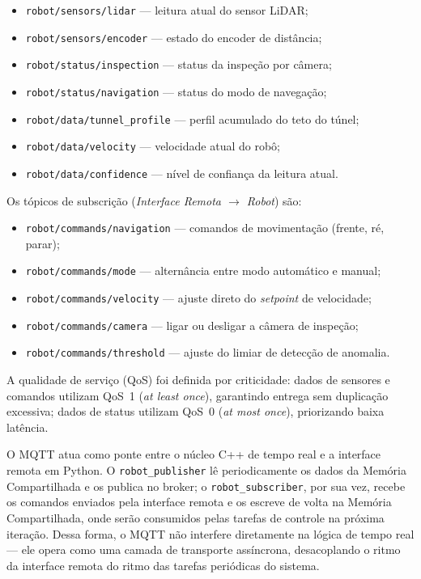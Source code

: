 \documentclass[12pt]{article}
\begin{document}
\begin{itemize}
    \item \texttt{robot/sensors/lidar} — leitura atual do sensor LiDAR;
    \item \texttt{robot/sensors/encoder} — estado do encoder de distância;
    \item \texttt{robot/status/inspection} — status da inspeção por câmera;
    \item \texttt{robot/status/navigation} — status do modo de navegação;
    \item \texttt{robot/data/tunnel\_profile} — perfil acumulado do teto do túnel;
    \item \texttt{robot/data/velocity} — velocidade atual do robô;
    \item \texttt{robot/data/confidence} — nível de confiança da leitura atual.
\end{itemize}

Os tópicos de subscrição (\textit{Interface Remota $\rightarrow$ Robot}) são:

\begin{itemize}
    \item \texttt{robot/commands/navigation} — comandos de movimentação (frente, ré, parar);
    \item \texttt{robot/commands/mode} — alternância entre modo automático e manual;
    \item \texttt{robot/commands/velocity} — ajuste direto do \textit{setpoint} de velocidade;
    \item \texttt{robot/commands/camera} — ligar ou desligar a câmera de inspeção;
    \item \texttt{robot/commands/threshold} — ajuste do limiar de detecção de anomalia.
\end{itemize}

A qualidade de serviço (QoS) foi definida por criticidade: dados de sensores e comandos utilizam QoS~1 (\textit{at least once}), garantindo entrega sem duplicação excessiva; dados de status utilizam QoS~0 (\textit{at most once}), priorizando baixa latência.

O MQTT atua como ponte entre o núcleo C++ de tempo real e a interface remota em Python. O \texttt{robot\_publisher} lê periodicamente os dados da Memória Compartilhada e os publica no broker; o \texttt{robot\_subscriber}, por sua vez, recebe os comandos enviados pela interface remota e os escreve de volta na Memória Compartilhada, onde serão consumidos pelas tarefas de controle na próxima iteração. Dessa forma, o MQTT não interfere diretamente na lógica de tempo real — ele opera como uma camada de transporte assíncrona, desacoplando o ritmo da interface remota do ritmo das tarefas periódicas do sistema.
\end{document}
